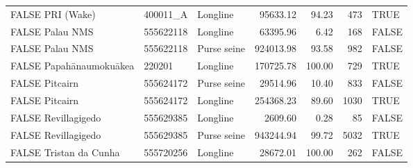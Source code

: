 \begin{table}
\begin{tabular}[t]{lllrrrl}
FALSE
PRI (Wake) & 400011\_A & Longline & 95633.12 & 94.23 & 473 & TRUE\\
FALSE
Palau NMS & 555622118 & Longline & 63395.96 & 6.42 & 168 & FALSE\\
FALSE
Palau NMS & 555622118 & Purse seine & 924013.98 & 93.58 & 982 & FALSE\\
FALSE
Papahānaumokuākea & 220201 & Longline & 170725.78 & 100.00 & 729 & TRUE\\
FALSE
Pitcairn & 555624172 & Purse seine & 29514.96 & 10.40 & 833 & FALSE\\
FALSE
Pitcairn & 555624172 & Longline & 254368.23 & 89.60 & 1030 & TRUE\\
FALSE
Revillagigedo & 555629385 & Longline & 2609.60 & 0.28 & 85 & FALSE\\
FALSE
Revillagigedo & 555629385 & Purse seine & 943244.94 & 99.72 & 5032 & TRUE\\
FALSE
Tristan da Cunha & 555720256 & Longline & 28672.01 & 100.00 & 262 & FALSE\\
\bottomrule
\end{tabular}
\end{table}
